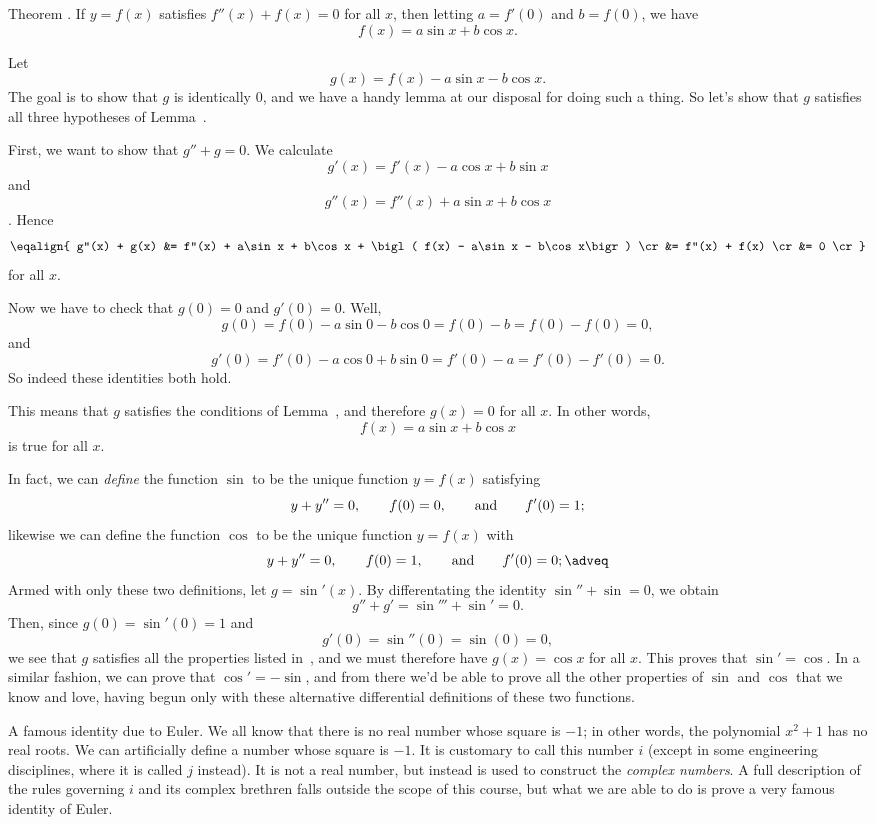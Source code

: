 \edef\thmcharacterisetrig{\the\thmcount}
\proclaim Theorem \advthm. If $y=f(x)$ satisfies $f''(x) + f(x) = 0$ for all $x$, then letting $a= f'(0)$
and $b=f(0)$, we have
$$f(x) = a\sin x + b\cos x.$$

\proof Let
$$g(x) = f(x) - a\sin x - b\cos x.$$
The goal is to show that $g$ is identically $0$, and we have a handy lemma at our disposal for doing such
a thing. So let's
show that $g$ satisfies all three hypotheses of Lemma~{\lemtrigdiffeq}.

First, we want to show that $g'' + g = 0$. We calculate
$$g'(x) = f'(x) - a\cos x + b\sin x$$
and
$$g''(x) = f''(x) + a\sin x + b\cos x$$.
Hence
$$\eqalign{
g''(x) + g(x) &= f''(x) + a\sin x + b\cos x + \bigl( f(x) - a\sin x - b\cos x\bigr) \cr
&= f''(x) + f(x) \cr
&= 0 \cr
}$$
for all $x$.

Now we have to check that $g(0) = 0$ and $g'(0) = 0$. Well,
$$g(0) = f(0) - a\sin 0 - b\cos 0 = f(0) - b = f(0) - f(0) = 0,$$
and
$$g'(0) = f'(0) - a\cos 0 + b\sin 0 = f'(0) - a = f'(0) - f'(0) = 0.$$
So indeed these identities both hold.

This means that $g$ satisfies the conditions of Lemma~{\lemtrigdiffeq}, and therefore $g(x) = 0$ for
all $x$. In other words,
$$f(x) = a\sin x + b\cos x$$
is true for all $x$.\slug

In fact, we can {\it define} the function $\sin$ to be the unique function $y=f(x)$ satisfying
$$y+y'' = 0,\qquad f(0) = 0, \qquad\hbox{and}\qquad f'(0) = 1;$$
likewise we can define the function $\cos$ to be the unique function $y=f(x)$ with
\edef\eqcosdef{\the\eqcount}
$$y+y'' = 0,\qquad f(0) = 1, \qquad\hbox{and}\qquad f'(0) = 0;\adveq$$
Armed with only these two definitions, let $g = \sin'(x)$. By differentating the identity $\sin'' + \sin =0$,
we obtain
$$g'' + g' = \sin''' + \sin' = 0.$$
Then, since $g(0) = \sin'(0) = 1$ and
$$g'(0) = \sin''(0) = \sin(0) = 0,$$
we see that $g$ satisfies all the properties listed in~\refeq{\eqcosdef}, and we must therefore
have $g(x) = \cos x$ for all $x$. This proves that $\sin' = \cos$. In a similar fashion, we can
prove that $\cos' = -\sin$, and
from there we'd be able to prove all the other properties of $\sin$ and $\cos$ that we know and love, having
begun only with these alternative differential definitions of these two functions.

\medskip\boldlabel \llap{*}A famous identity due to Euler. We all know
that there is no real number whose square
is $-1$; in other words, the polynomial $x^2 + 1$ has no real roots. We can artificially define a number
whose square is $-1$. It is customary to call this number $i$ (except in some engineering disciplines, where
it is called $j$ instead). It is not a real number, but instead is used to construct the {\it complex numbers}.
A full description of the rules governing $i$ and its complex brethren falls outside the scope of this course,
but what we are able to do is prove a very famous identity of Euler.

